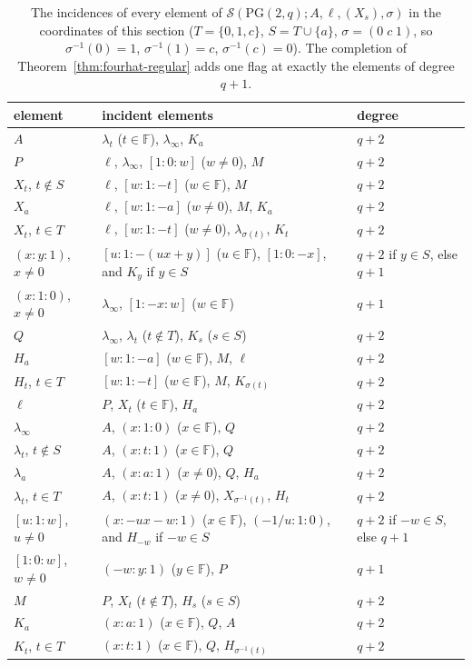\documentclass[11pt]{amsart}
\theoremstyle{definition}
\theoremstyle{remark}
\newcommand{\cS}{\mathcal{S}}
\newcommand{\PG}{\mathrm{PG}}
\newcommand{\F}{\mathbb{F}}
\newcommand{\pnt}[3]{({#1}{:}{#2}{:}{#3})}
\newcommand{\lin}[3]{[{#1}{:}{#2}{:}{#3}]}
\newcommand{\lam}{\lambda}
\begin{document}
\begin{table}[ht]
\centering\small
\renewcommand{\arraystretch}{1.12}
\begin{tabular}{@{}lll@{}}
\toprule
element & incident elements & degree\\
\midrule
$A$ & $\lam_t$ ($t\in\F$), $\lam_\infty$, $K_a$ & $q+2$\\
$P$ & $\ell$, $\lam_\infty$, $\lin 10w$ ($w\ne0$), $M$ & $q+2$\\
$X_t$, $t\notin S$ & $\ell$, $\lin w1{-t}$ ($w\in\F$), $M$ & $q+2$\\
$X_a$ & $\ell$, $\lin w1{-a}$ ($w\ne0$), $M$, $K_a$ & $q+2$\\
$X_t$, $t\in T$ & $\ell$, $\lin w1{-t}$ ($w\ne0$), $\lam_{\sigma(t)}$, $K_t$ & $q+2$\\
$\pnt xy1$, $x\ne0$ & $\lin u1{-(ux+y)}$ ($u\in\F$), $\lin10{-x}$, and $K_y$ if $y\in S$ & $q+2$ if $y\in S$, else $q+1$\\
$\pnt x10$, $x\ne0$ & $\lam_\infty$, $\lin1{-x}w$ ($w\in\F$) & $q+1$\\
$Q$ & $\lam_\infty$, $\lam_t$ ($t\notin T$), $K_s$ ($s\in S$) & $q+2$\\
$H_a$ & $\lin w1{-a}$ ($w\in\F$), $M$, $\ell$ & $q+2$\\
$H_t$, $t\in T$ & $\lin w1{-t}$ ($w\in\F$), $M$, $K_{\sigma(t)}$ & $q+2$\\
\midrule
$\ell$ & $P$, $X_t$ ($t\in\F$), $H_a$ & $q+2$\\
$\lam_\infty$ & $A$, $\pnt x10$ ($x\in\F$), $Q$ & $q+2$\\
$\lam_t$, $t\notin S$ & $A$, $\pnt xt1$ ($x\in\F$), $Q$ & $q+2$\\
$\lam_a$ & $A$, $\pnt xa1$ ($x\ne0$), $Q$, $H_a$ & $q+2$\\
$\lam_t$, $t\in T$ & $A$, $\pnt xt1$ ($x\ne0$), $X_{\sigma^{-1}(t)}$, $H_t$ & $q+2$\\
$\lin u1w$, $u\ne0$ & $\pnt x{-ux-w}1$ ($x\in\F$), $\pnt{-1/u}10$, and $H_{-w}$ if $-w\in S$ & $q+2$ if $-w\in S$, else $q+1$\\
$\lin10w$, $w\ne0$ & $\pnt{-w}y1$ ($y\in\F$), $P$ & $q+1$\\
$M$ & $P$, $X_t$ ($t\notin T$), $H_s$ ($s\in S$) & $q+2$\\
$K_a$ & $\pnt xa1$ ($x\in\F$), $Q$, $A$ & $q+2$\\
$K_t$, $t\in T$ & $\pnt xt1$ ($x\in\F$), $Q$, $H_{\sigma^{-1}(t)}$ & $q+2$\\
\bottomrule
\end{tabular}
\caption{The incidences of every element of $\cS(\PG(2,q);A,\ell,(X_s),\sigma)$ in the coordinates of this section ($T=\{0,1,c\}$, $S=T\cup\{a\}$, $\sigma=(0\;c\;1)$, so $\sigma^{-1}(0)=1$, $\sigma^{-1}(1)=c$, $\sigma^{-1}(c)=0$). The completion of Theorem~\ref{thm:fourhat-regular} adds one flag at exactly the elements of degree $q+1$.}\label{tab:nbrs4}
\end{table}
\end{document}
